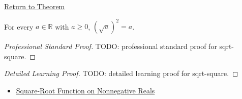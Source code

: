 \newpage
{}
\label{prf:sqrt-square}

\begin{remark*}[Return]
\hyperref[thm:sqrt-square]{Return to Theorem}
\end{remark*}

\begin{theorem*}
For every $a\in\mathbb{R}$ with $a\ge0$, $(\sqrt a)^2=a$.
\end{theorem*}

\begin{proof}[Professional Standard Proof]
\LRAProofBodyStart
TODO: professional standard proof for sqrt-square.
\end{proof}

\begin{proof}[Detailed Learning Proof]
\LRAProofBodyStart
TODO: detailed learning proof for sqrt-square.
\end{proof}

\begin{remark*}
\end{remark*}

\begin{dependencies}
\begin{itemize}
  \item \hyperref[def:real-square-root-function]{Square-Root Function on Nonnegative Reals}
\end{itemize}
\end{dependencies}

\clearpage

